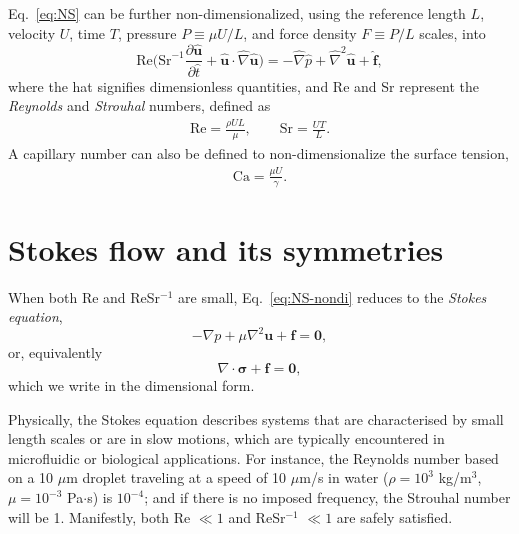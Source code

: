 Eq.\ \eqref{eq:NS} can be further non-dimensionalized, using the reference length $L$, velocity $U$, time $T$, pressure $P \equiv \mu U/L$, and force density $F \equiv P/L$ scales, into
\begin{equation}
   \textrm{Re} \bigg(\textrm{Sr}^{-1} \frac{\partial \hat{\bm u}}{\partial \hat{t}} + \hat{\bm u} \cdot \hat{\nabla} \hat{\bm u} \bigg) =
   -\hat{\nabla} \hat{p} + \hat{\nabla} ^2  \hat{\bm u} + \hat{\bm f},
  \label{eq:NS-nondi}
\end{equation}
where the hat signifies dimensionless quantities, and Re and Sr represent the \emph{Reynolds} and \emph{Strouhal} numbers, defined as
\begin{equation}
  \begin{aligned}
    \textrm{Re} = \frac{\rho UL}{\mu},\quad \quad \textrm{Sr} = \frac{UT}{L}.
  \end{aligned}
\end{equation}
A capillary number can also be defined to non-dimensionalize the surface tension,
\begin{equation}
  \begin{aligned}
    \textrm{Ca} = \frac{\mu U}{\gamma}.
  \end{aligned}
\end{equation}




\section{Stokes flow and its symmetries}
\label{sec:stokes-flows}

When both Re and ReSr$^{-1}$ are small, Eq.\ \eqref{eq:NS-nondi} reduces to the \emph{Stokes equation},
\begin{equation}
   -\nabla p + \mu \nabla ^2  {\bm u} + {\bm f} = {\bm 0},
 \label{eq:Stokes}
\end{equation}
or, equivalently
\begin{equation}
   \nabla \cdot  {\bm \sigma} + {\bm f} = {\bm 0},
 \label{eq:Stokes1}
\end{equation}
which we write in the dimensional form.

Physically, the Stokes equation describes systems that are characterised by small length scales or are in slow motions, which are typically encountered in microfluidic or biological applications.
For instance, the Reynolds number based on a 10 $\mu$m droplet traveling at a speed of 10 $\mu$m/s in water ($\rho=10^3$ kg/m$^{3}$, $\mu=10^{-3}$ Pa$\cdot$s) is $10^{-4}$;
and if there is no imposed frequency, the Strouhal number will be 1.
Manifestly, both Re $\ll 1$ and ReSr$^{-1}$ $\ll 1$ are safely satisfied.

